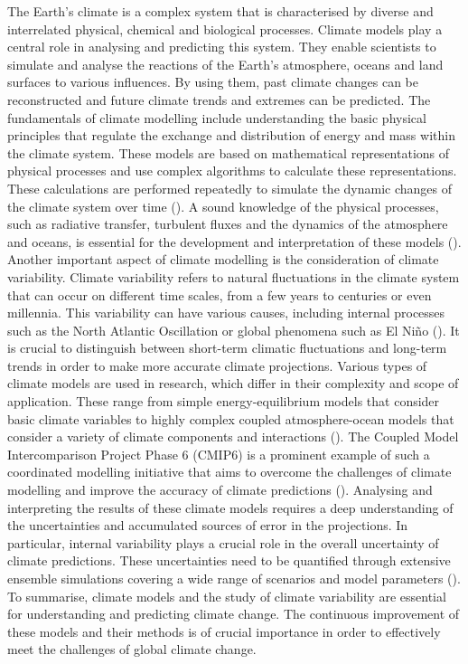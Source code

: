 \documentclass[
]{krantz}
\begin{document}
The Earth's climate is a complex system that is characterised by diverse and interrelated physical, chemical and biological processes. Climate models play a central role in analysing and predicting this system. They enable scientists to simulate and analyse the reactions of the Earth's atmosphere, oceans and land surfaces to various influences. By using them, past climate changes can be reconstructed and future climate trends and extremes can be predicted.
The fundamentals of climate modelling include understanding the basic physical principles that regulate the exchange and distribution of energy and mass within the climate system. These models are based on mathematical representations of physical processes and use complex algorithms to calculate these representations. These calculations are performed repeatedly to simulate the dynamic changes of the climate system over time (\citet{eyring2016overview}). A sound knowledge of the physical processes, such as radiative transfer, turbulent fluxes and the dynamics of the atmosphere and oceans, is essential for the development and interpretation of these models (\citet{latif2022natural}).
Another important aspect of climate modelling is the consideration of climate variability. Climate variability refers to natural fluctuations in the climate system that can occur on different time scales, from a few years to centuries or even millennia. This variability can have various causes, including internal processes such as the North Atlantic Oscillation or global phenomena such as El Niño (\citet{deser}). It is crucial to distinguish between short-term climatic fluctuations and long-term trends in order to make more accurate climate projections.
Various types of climate models are used in research, which differ in their complexity and scope of application. These range from simple energy-equilibrium models that consider basic climate variables to highly complex coupled atmosphere-ocean models that consider a variety of climate components and interactions (\citet{eyring2016overview}). The Coupled Model Intercomparison Project Phase 6 (CMIP6) is a prominent example of such a coordinated modelling initiative that aims to overcome the challenges of climate modelling and improve the accuracy of climate predictions (\citet{eyring2016overview}).
Analysing and interpreting the results of these climate models requires a deep understanding of the uncertainties and accumulated sources of error in the projections. In particular, internal variability plays a crucial role in the overall uncertainty of climate predictions. These uncertainties need to be quantified through extensive ensemble simulations covering a wide range of scenarios and model parameters (\citet{deser}).
To summarise, climate models and the study of climate variability are essential for understanding and predicting climate change. The continuous improvement of these models and their methods is of crucial importance in order to effectively meet the challenges of global climate change.
\end{document}

